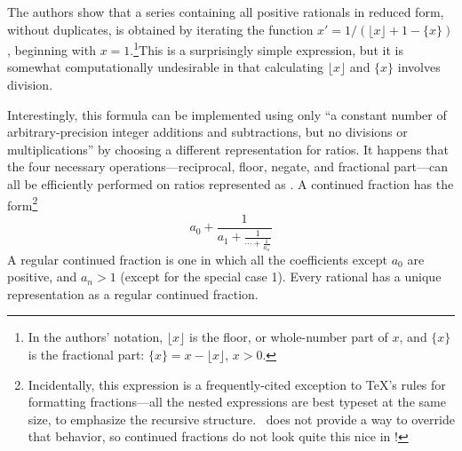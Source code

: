 The authors show that a series containing all positive rationals in reduced form, without duplicates, is obtained by iterating the function 
$x' = 1/{(\lfloor x \rfloor + 1 - \{x\})}$, beginning with $x=1$.\footnote{In the authors' notation, $\lfloor x \rfloor$ is the floor, or whole-number part of $x$, and $\{x\}$ is the fractional part: $\{x\} = x - \lfloor x \rfloor$, $x > 0$.}This is a surprisingly simple expression, but it is somewhat computationally undesirable in that calculating $\lfloor x \rfloor$ and $\{x\}$ involves division.

Interestingly, this formula can be implemented using only ``a constant number of arbitrary-precision integer additions and subtractions, but no divisions or multiplications'' by choosing a different representation for ratios. It happens that the four necessary operations---reciprocal, floor, negate, and fractional part---can all be efficiently performed on ratios represented as . A continued fraction has the form\footnote{Incidentally, this expression is a frequently-cited exception to \TeX's rules for formatting fractions---all the nested expressions are best typeset at the same size, to emphasize the recursive structure. \Meta\ does not provide a way to override that behavior, so continued fractions do not look quite this nice in \Meta!}
$$a_0 + \frac{1}{
    \displaystyle a_1 + \frac{\displaystyle 1}{
        \displaystyle \cdots + \frac{\displaystyle 1}{
            \displaystyle a_n}}}$$
A regular continued fraction is one in which all the coefficients except $a_0$ are positive, and $a_n > 1$ (except for the special case 1). Every rational has a unique representation as a regular continued fraction.

